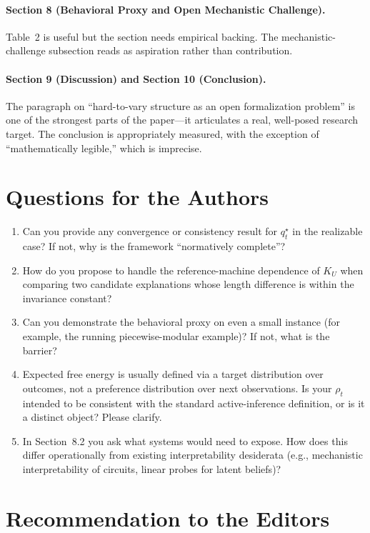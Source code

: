 \documentclass[11pt]{article}
\begin{document}
\paragraph{Section 8 (Behavioral Proxy and Open Mechanistic Challenge).} Table~2 is useful but the section needs empirical backing. The mechanistic-challenge subsection reads as aspiration rather than contribution.

\paragraph{Section 9 (Discussion) and Section 10 (Conclusion).} The paragraph on ``hard-to-vary structure as an open formalization problem'' is one of the strongest parts of the paper---it articulates a real, well-posed research target. The conclusion is appropriately measured, with the exception of ``mathematically legible,'' which is imprecise.

\section*{Questions for the Authors}

\begin{enumerate}[leftmargin=*]
\item Can you provide any convergence or consistency result for $q_t^\star$ in the realizable case? If not, why is the framework ``normatively complete''?
\item How do you propose to handle the reference-machine dependence of $K_U$ when comparing two candidate explanations whose length difference is within the invariance constant?
\item Can you demonstrate the behavioral proxy on even a small instance (for example, the running piecewise-modular example)? If not, what is the barrier?
\item Expected free energy is usually defined via a target distribution over outcomes, not a preference distribution over next observations. Is your $\rho_t$ intended to be consistent with the standard active-inference definition, or is it a distinct object? Please clarify.
\item In Section~8.2 you ask what systems would need to expose. How does this differ operationally from existing interpretability desiderata (e.g., mechanistic interpretability of circuits, linear probes for latent beliefs)?
\end{enumerate}

\section*{Recommendation to the Editors}
\end{document}
